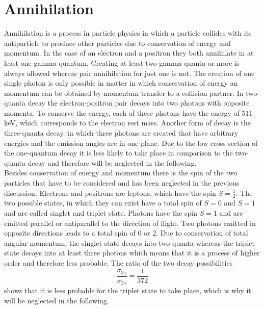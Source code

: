 \section{Annihilation}
Annihilation is a process in particle physics in which a particle collides with its antiparticle to produce other particles due to conservation of energy and momentum. In the case of an electron and a positron they both annihilate in at least one gamma quantum. Creating at least two gamma quanta or more is always allowed whereas pair annihilation for just one is not. The creation of one single photon is only possible in matter in which conservation of energy an momentum can be obtained by momentum transfer to a collision partner. In two-quanta decay the electron-positron pair decays into two photons with opposite momenta. To conserve the energy, each of these photons have the energy of $511\,$keV, which corresponds to the electron rest mass. Another form of decay is the three-quanta decay, in which three photons are created that have arbitrary energies and the emission angles are in one plane. Due to the low cross section of the one-quantum decay it is less likely to take place in comparison to the two-quanta decay and therefore will be neglected in the following. \\
Besides conservation of energy and momentum there is the spin of the two particles that have to be considered and has been neglected in the previous discussion. Electrons and positrons are leptons, which have the spin $S=\frac{1}{2}$. The two possible states, in which they can exist have a total spin of $S=0$ and $S=1$ and are called singlet and triplet state. Photons have the spin $S=1$ and are emitted parallel or antiparallel to the direction of flight. Two photons emitted in opposite directions leads to a total spin of 0 or 2. Due to conservation of total angular momentum, the singlet state decays into two quanta whereas the triplet state decays into at least three photons which means that it is a process of higher order and therefore less probable. The ratio of the two decay possibilities
\begin{equation}
    \frac{\sigma_{3\gamma}}{\sigma_{2\gamma}}=\frac{1}{372}
    \label{ration decay}
\end{equation} shows that it is less probable for the triplet state to take place, which is why it will be neglected in the following.




